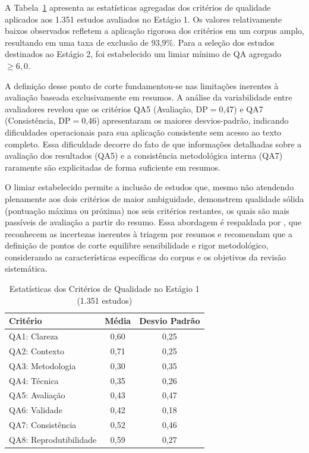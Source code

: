 A Tabela~\ref{tab:estatisticas_qualidade_total} apresenta as estatísticas agregadas dos critérios de qualidade aplicados aos 1.351 estudos avaliados no Estágio 1. Os valores relativamente baixos observados refletem a aplicação rigorosa dos critérios em um corpus amplo, resultando em uma taxa de exclusão de 93,9\%. Para a seleção dos estudos destinados ao Estágio 2, foi estabelecido um limiar mínimo de QA agregado $\geq 6,0$.



A definição desse ponto de corte fundamentou-se nas limitações inerentes à avaliação baseada exclusivamente em resumos. A análise da variabilidade entre avaliadores revelou que os critérios QA5 (Avaliação, DP$=$0,47) e QA7 (Consistência, DP$=$0,46) apresentaram os maiores desvios-padrão, indicando dificuldades operacionais para sua aplicação consistente sem acesso ao texto completo. Essa dificuldade decorre do fato de que informações detalhadas sobre a avaliação dos resultados (QA5) e a consistência metodológica interna (QA7) raramente são explicitadas de forma suficiente em resumos.

O limiar estabelecido permite a inclusão de estudos que, mesmo não atendendo plenamente aos dois critérios de maior ambiguidade, demonstrem qualidade sólida (pontuação máxima ou próxima) nos seis critérios restantes, os quais são mais passíveis de avaliação a partir do resumo. Essa abordagem é respaldada por \cite{Kitchenham2004}, que reconhecem as incertezas inerentes à triagem por resumos e recomendam que a definição de pontos de corte equilibre sensibilidade e rigor metodológico, considerando as características específicas do corpus e os objetivos da revisão sistemática.


\begin{table}[htbp]
\centering
\caption{Estatísticas dos Critérios de Qualidade no Estágio 1 (1.351 estudos)} 
\label{tab:estatisticas_qualidade_total}
\begin{tabular}{lcc}
\toprule
\textbf{Critério} & \textbf{Média} & \textbf{Desvio Padrão} \\
\midrule
QA1: Clareza & 0,60 & 0,25 \\
QA2: Contexto & 0,71 & 0,25 \\
QA3: Metodologia & 0,30 & 0,35 \\
QA4: Técnica & 0,35 & 0,26 \\
QA5: Avaliação & 0,43 & 0,47 \\
QA6: Validade & 0,42 & 0,18 \\
QA7: Consistência & 0,52 & 0,46 \\
QA8: Reprodutibilidade & 0,59 & 0,27 \\
\bottomrule
\end{tabular}
\end{table}

